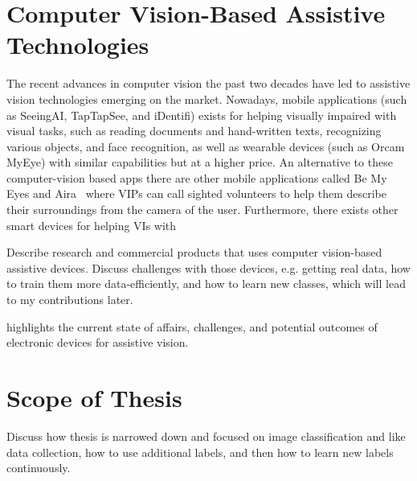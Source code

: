 



\section{Computer Vision-Based Assistive Technologies} %

The recent advances in computer vision the past two decades have led to assistive vision technologies emerging on the market. Nowadays, mobile applications (such as SeeingAI, TapTapSee, and iDentifi)  exists for helping visually impaired with visual tasks, such as reading documents and hand-written texts, recognizing various objects, and face recognition, as well as wearable devices (such as Orcam MyEye) with similar capabilities but at a higher price. An alternative to these computer-vision based apps there are other mobile applications called Be My Eyes and Aira~\cite{aira2022web} where VIPs can call sighted volunteers to help them describe their surroundings from the camera of the user. Furthermore, there exists other smart devices for helping VIs with 

 

Describe research and commercial products that uses computer vision-based assistive devices. Discuss challenges with those devices, e.g. getting real data, how to train them more data-efficiently, and how to learn new classes, which will lead to my contributions later. 

\cite{manduchi2012computer} highlights the current state of affairs, challenges, and potential outcomes of electronic devices for assistive vision. 

\section{Scope of Thesis}
Discuss how thesis is narrowed down and focused on image classification and like data collection, how to use additional labels, and then how to learn new labels continuously. 


